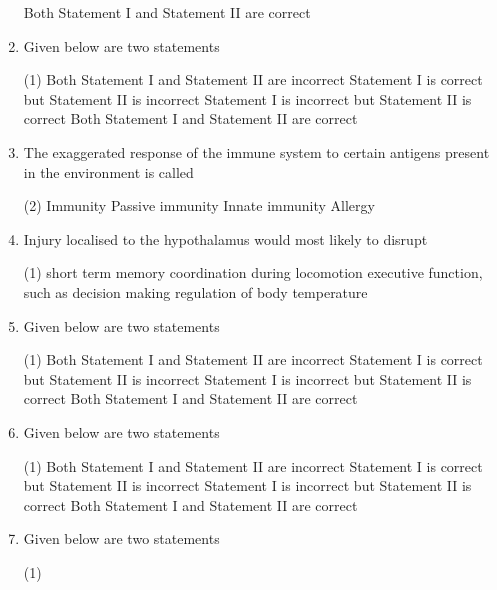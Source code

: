 \documentclass[twocolumn]{article}
\begin{document}
\begin{enumerate}
\begin{tasks}
              \task Both Statement I and Statement II are correct
          \end{tasks}
    \item Given below are two statements
          \begin{tasks}(1)
              \task Both Statement I and Statement II are incorrect
              \task Statement I is correct but Statement II is incorrect
              \task Statement I is incorrect but Statement II is correct
              \task Both Statement I and Statement II are correct
          \end{tasks}
    \item The exaggerated response of the immune system to certain antigens present in the environment is called
          \begin{tasks}(2)
              \task Immunity
              \task Passive immunity
              \task Innate immunity
              \task Allergy
          \end{tasks}
    \item Injury localised to the hypothalamus would most likely to disrupt
          \begin{tasks}(1)
              \task short term memory
              \task coordination during locomotion
              \task executive function, such as decision making
              \task regulation of body temperature
          \end{tasks}
    \item Given below are two statements
          \begin{tasks}(1)
              \task Both Statement I and Statement II are incorrect
              \task Statement I is correct but Statement II is incorrect
              \task Statement I is incorrect but Statement II is correct
              \task Both Statement I and Statement II are correct
          \end{tasks}
    \item Given below are two statements
          \begin{tasks}(1)
              \task Both Statement I and Statement II are incorrect
              \task Statement I is correct but Statement II is incorrect
              \task Statement I is incorrect but Statement II is correct
              \task Both Statement I and Statement II are correct
          \end{tasks}
    \item Given below are two statements
          \begin{tasks}(1)

\end{tasks}
\end{enumerate}
\end{document}
